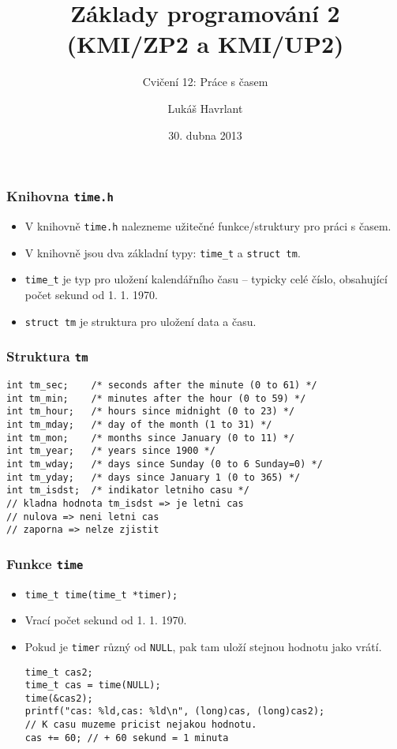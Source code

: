 \documentclass{beamer}
\title{Základy programování 2 (KMI/ZP2 a KMI/UP2)}
\subtitle{Cvičení 12: Práce s časem}
\author{Lukáš Havrlant}
\date{30. dubna 2013}
\institute{Univerzita Palackého}
\newenvironment{itemizex}%
  {\large \begin{itemize}%
    \setlength{\itemsep}{8pt}%
    \setlength{\parskip}{8pt}}%
  {\end{itemize}}
\begin{document}
\begin{frame}[t,plain]
\titlepage
\end{frame}



\begin{frame}[t,fragile]\frametitle{Knihovna \texttt{time.h}} 
  \begin{itemizex}
    \item V knihovně \texttt{time.h} nalezneme užitečné funkce/struktury pro práci s časem.
    \item V knihovně jsou dva základní typy: \texttt{time\_t} a \texttt{struct tm}.
    \item \texttt{time\_t} je typ pro uložení kalendářního času -- typicky celé číslo, obsahující počet sekund od 1. 1. 1970. 
    \item \texttt{struct tm} je struktura pro uložení data a času. 
  \end{itemizex}
\end{frame}


\begin{frame}[t,fragile]\frametitle{Struktura \texttt{tm}} 
\begin{verbatim} 
int tm_sec;    /* seconds after the minute (0 to 61) */
int tm_min;    /* minutes after the hour (0 to 59) */
int tm_hour;   /* hours since midnight (0 to 23) */
int tm_mday;   /* day of the month (1 to 31) */
int tm_mon;    /* months since January (0 to 11) */
int tm_year;   /* years since 1900 */
int tm_wday;   /* days since Sunday (0 to 6 Sunday=0) */
int tm_yday;   /* days since January 1 (0 to 365) */
int tm_isdst;  /* indikator letniho casu */
// kladna hodnota tm_isdst => je letni cas
// nulova => neni letni cas
// zaporna => nelze zjistit
\end{verbatim}
\end{frame}


\begin{frame}[t,fragile]\frametitle{Funkce \texttt{time}} 
  \begin{itemizex}
    \item \texttt{time\_t time(time\_t *timer);}
    \item Vrací počet sekund od 1. 1. 1970. 
    \item Pokud je \texttt{timer} různý od \texttt{NULL}, pak tam uloží stejnou hodnotu jako vrátí.
\begin{verbatim} 
time_t cas2;
time_t cas = time(NULL);
time(&cas2);
printf("cas: %ld,cas: %ld\n", (long)cas, (long)cas2);
// K casu muzeme pricist nejakou hodnotu. 
cas += 60; // + 60 sekund = 1 minuta
\end{verbatim}
  \end{itemizex}
\end{frame}
\end{document}
